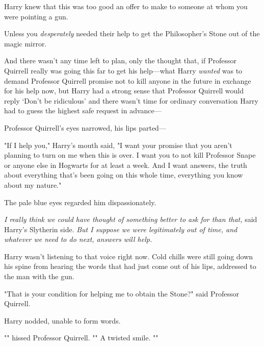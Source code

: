 Harry knew that this was too good an offer to make to someone at whom you were
pointing a gun.

Unless you \emph{desperately} needed their help to get the Philosopher's Stone
out of the magic mirror.

And there wasn't any time left to plan, only the thought that, if Professor
Quirrell really was going this far to get his help—what Harry \emph{wanted}
was to demand Professor Quirrell promise not to kill anyone in the future in
exchange for his help now, but Harry had a strong sense that Professor Quirrell
would reply `Don't be ridiculous' and there wasn't time for ordinary
conversation Harry had to guess the highest safe request in advance—

Professor Quirrell's eyes narrowed, his lips parted—

"If I help you," Harry's mouth said, "I want your promise that you aren't
planning to turn on me when this is over. I want you to not kill Professor
Snape or anyone else in Hogwarts for at least a week. And I want answers, the
truth about everything that's been going on this whole time, everything you
know about my nature."

The pale blue eyes regarded him dispassionately.

\emph{I really think we could have thought of something better to ask for than
that,} said Harry's Slytherin side. \emph{But I suppose we were legitimately
out of time, and whatever we need to do next, answers will help.}

Harry wasn't listening to that voice right now. Cold chills were still going
down his spine from hearing the words that had just come out of his lips,
addressed to the man with the gun.

"That is your condition for helping me to obtain the Stone?" said Professor
Quirrell.

Harry nodded, unable to form words.

"" hissed Professor Quirrell. "" A twisted smile.
""

